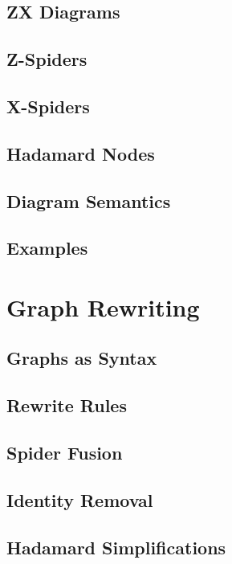 \documentclass[11pt,a4paper]{article}
\begin{document}
\subsection{ZX Diagrams}

\subsection{Z-Spiders}

\subsection{X-Spiders}

\subsection{Hadamard Nodes}

\subsection{Diagram Semantics}

\subsection{Examples}


\section{Graph Rewriting}

\subsection{Graphs as Syntax}

\subsection{Rewrite Rules}

\subsection{Spider Fusion}

\subsection{Identity Removal}

\subsection{Hadamard Simplifications}
\end{document}
